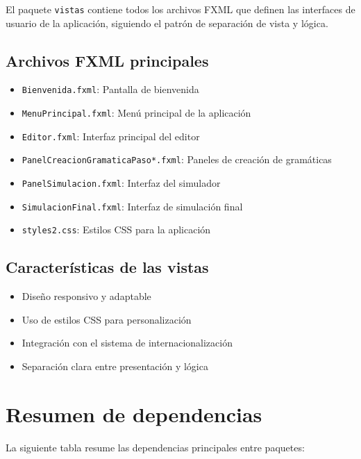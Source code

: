 El paquete \texttt{vistas} contiene todos los archivos FXML que definen las interfaces de usuario de la aplicación, siguiendo el patrón de separación de vista y lógica.

\subsection{Archivos FXML principales}

\begin{itemize}
    \item \texttt{Bienvenida.fxml}: Pantalla de bienvenida
    \item \texttt{MenuPrincipal.fxml}: Menú principal de la aplicación
    \item \texttt{Editor.fxml}: Interfaz principal del editor
    \item \texttt{PanelCreacionGramaticaPaso*.fxml}: Paneles de creación de gramáticas
    \item \texttt{PanelSimulacion.fxml}: Interfaz del simulador
    \item \texttt{SimulacionFinal.fxml}: Interfaz de simulación final
    \item \texttt{styles2.css}: Estilos CSS para la aplicación
\end{itemize}

\subsection{Características de las vistas}

\begin{itemize}
    \item Diseño responsivo y adaptable
    \item Uso de estilos CSS para personalización
    \item Integración con el sistema de internacionalización
    \item Separación clara entre presentación y lógica
\end{itemize}

\section{Resumen de dependencias}

La siguiente tabla resume las dependencias principales entre paquetes:

